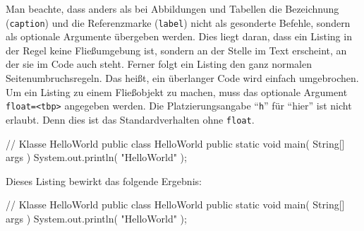 Man beachte, dass anders als bei Abbildungen und Tabellen
die Bezeichnung (\texttt{caption}) und die Referenzmarke (\texttt{label})
nicht als gesonderte Befehle, sondern als optionale Argumente übergeben werden.
Dies liegt daran, dass ein Listing in der Regel keine Fließumgebung ist,
sondern an der Stelle im Text erscheint, an der sie im Code auch steht.
Ferner folgt ein Listing den ganz normalen Seitenumbruchsregeln.
Das heißt, ein überlanger Code wird einfach umgebrochen. 
Um ein Listing zu einem Fließobjekt zu machen, muss das optionale Argument
\texttt{float=<tbp>} angegeben werden.
Die Platzierungsangabe \enquote{\texttt{h}} für \enquote{hier}
ist nicht erlaubt. Denn dies ist das Standardverhalten ohne \texttt{float}.
%
\begin{latex}[caption={Beispiel eines LaTeX-Quellcodes für ein Java-Listing},label={lst:java-listing}]
\begin{java}[caption={Ein Hello-World Beispiel in Java},
             label={lst:hello-world}]
// Klasse HelloWorld
public class HelloWorld {
  public static void main( String[] args ) {
    System.out.println( "HelloWorld" );
  }
}
\end{java}
\end{latex}
%
Dieses Listing bewirkt das folgende Ergebnis:
%
\begin{java}[caption={Ein Hello-World Beispiel in Java},
             label={lst:hello-world}]
// Klasse HelloWorld
public class HelloWorld {
  public static void main( String[] args ) {
    System.out.println( "HelloWorld" );
  }
}
\end{java}

